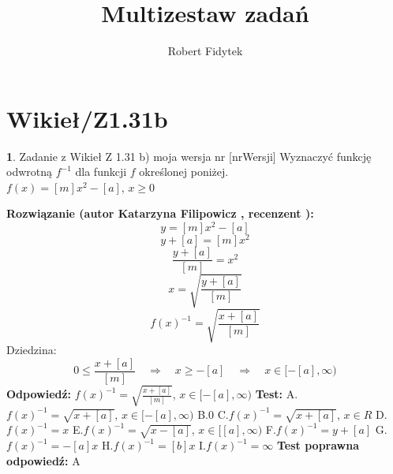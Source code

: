 \documentclass[12pt, a4paper]{article}
\title{Multizestaw zadań}
\author{Robert Fidytek}
\date{}
\theoremstyle{definition} %
\newtheorem{zad}{}
\newcommand{\kategoria}[1]{\section{#1}} %
\newcommand{\zadStart}[1]{\begin{zad}#1\newline} %
\newcommand{\zadStop}{\end{zad}}   %
\newcommand{\rozwStart}[2]{\noindent \textbf{Rozwiązanie (autor #1 , recenzent #2): }\newline} %
\newcommand{\rozwStop}{\newline}                                            %
\newcommand{\odpStart}{\noindent \textbf{Odpowiedź:}\newline}    %
\newcommand{\odpStop}{\newline}                                             %
\newcommand{\testStart}{\noindent \textbf{Test:}\newline} %
\newcommand{\testStop}{\newline} %
\newcommand{\kluczStart}{\noindent \textbf{Test poprawna odpowiedź:}\newline} %
\newcommand{\kluczStop}{\newline} %
\begin{document}
\maketitle


\kategoria{Wikieł/Z1.31b}
\zadStart{Zadanie z Wikieł Z 1.31 b) moja wersja nr [nrWersji]}
Wyznaczyć funkcję odwrotną $f^{-1}$ dla funkcji $f$ określonej poniżej. \\
$f(x)=[m]x^2-[a]$, $x\geq 0$
\zadStop
\rozwStart{Katarzyna Filipowicz}{}
$$
y=[m]x^2-[a] 
$$ $$
y+[a]=[m]x^2
$$ $$
\frac{y+[a]}{[m]}=x^2
$$ $$
x=\sqrt{\frac{y+[a]}{[m]}}
$$ $$
f(x)^{-1}=\sqrt{\frac{x+[a]}{[m]}}
$$ 
Dziedzina:
$$
0\leq \frac{x+[a]}{[m]} \quad \Rightarrow   \quad  x \geq -[a] \quad \Rightarrow \quad x\in [-[a],\infty)
$$
\rozwStop
\odpStart
$f(x)^{-1}=\sqrt{\frac{x+[a]}{[m]}}$, $x\in [-[a],\infty)$
\odpStop
\testStart
A.$f(x)^{-1}=\sqrt{x+[a]}$, $x\in [-[a],\infty)$
B.$0$
C.$f(x)^{-1}=\sqrt{x+[a]}$, $x \in R$
D.$f(x)^{-1}=x$
E.$f(x)^{-1}=\sqrt{x-[a]}$, $x \in  [[a],\infty)$
F.$f(x)^{-1}=y+[a]$
G.$f(x)^{-1}=-[a]x$
H.$f(x)^{-1}=[b]x$
I.$f(x)^{-1}=\infty$
\testStop
\kluczStart
A
\kluczStop
\end{document}
